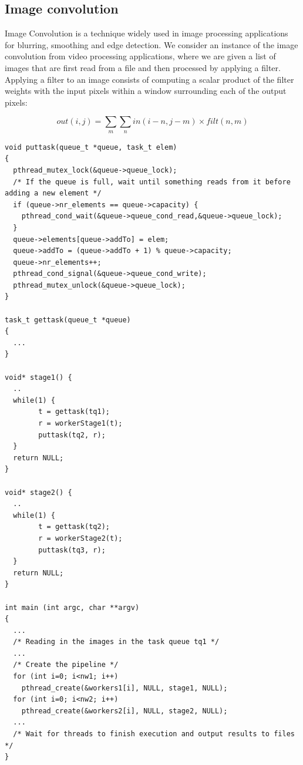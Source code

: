 \subsection{Image convolution}

Image Convolution  is a technique widely used in image processing applications for
blurring, smoothing and edge detection. We consider an instance of the image convolution from video processing applications, where we are given a list of images that are first read from a file and then processed by applying a filter. Applying a filter to an image consists of computing a scalar product of the filter weights with the input pixels within a window surrounding each of the output pixels:
	
\begin{equation}\label{eqn:01}
\textit{out}(i,j)=\sum_{m}\sum_{n} \textit{in}(i-n,j-m)\times \textit{filt}(n,m)
\end{equation}

\begin{lstlisting}[label=convo0, caption={Original Convolution with PThreads}, frame=single]
void puttask(queue_t *queue, task_t elem)
{
  pthread_mutex_lock(&queue->queue_lock);
  /* If the queue is full, wait until something reads from it before adding a new element */
  if (queue->nr_elements == queue->capacity) {
    pthread_cond_wait(&queue->queue_cond_read,&queue->queue_lock);
  }
  queue->elements[queue->addTo] = elem;
  queue->addTo = (queue->addTo + 1) % queue->capacity;
  queue->nr_elements++;
  pthread_cond_signal(&queue->queue_cond_write);
  pthread_mutex_unlock(&queue->queue_lock);
}
  
task_t gettask(queue_t *queue)
{
  ...
}

void* stage1() {
  ..
  while(1) {
		t = gettask(tq1);
		r = workerStage1(t);
		puttask(tq2, r);
  }
  return NULL;
}

void* stage2() {
  ..
  while(1) {
		t = gettask(tq2);
		r = workerStage2(t);
		puttask(tq3, r);
  }
  return NULL;
}

int main (int argc, char **argv)
{
  ... 
  /* Reading in the images in the task queue tq1 */
  ...
  /* Create the pipeline */
  for (int i=0; i<nw1; i++)
    pthread_create(&workers1[i], NULL, stage1, NULL);
  for (int i=0; i<nw2; i++)
    pthread_create(&workers2[i], NULL, stage2, NULL);
  ...
  /* Wait for threads to finish execution and output results to files */    
}

\end{lstlisting}

